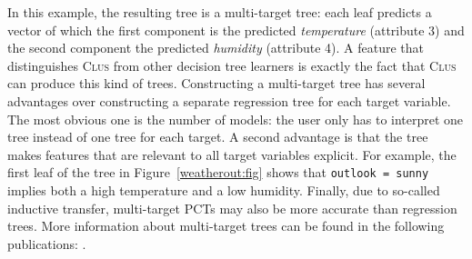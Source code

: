 \documentclass[a4paper]{report}
\newcommand{\clus}{\textsc{Clus}}
\begin{document}
\begin{enumerate}
In this example, the resulting tree is a multi-target tree: each leaf predicts a vector of which the first component is the predicted \emph{temperature} (attribute 3) and the second component the predicted \emph{humidity} (attribute 4).  A feature that distinguishes \clus{} from other decision tree learners is exactly the fact that \clus{} can produce this kind of trees.  Constructing a multi-target tree has several advantages over constructing a separate regression tree for each target variable. The most obvious one is the number of models: the user only has to interpret one tree instead of one tree for each target. A second advantage is that the tree makes features that are relevant to all target variables explicit. For example, the first leaf of the tree in Figure~\ref{weatherout:fig} shows that \texttt{outlook = sunny} implies both a high temperature and a low humidity. Finally, due to so-called inductive transfer, multi-target PCTs may also be more accurate than regression trees. More information about multi-target trees can be found in the following publications: \cite{Blockeel1998icml, Blockeel99:proc, Struyf06-KDID:proc, Piccart08-DS:proc}.

\end{enumerate}
% 
% 
% 
% 
% 
% 
\end{document}
